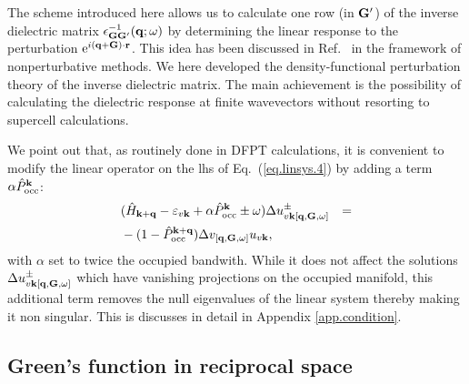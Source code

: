 \documentclass[twocolumn,prb,showpacs,superscriptaddress]{revtex4}
\def\w{\omega}
\def\H{\hat{H}}
\def\P{\hat{P}_{\rm occ}}
\def\E{\varepsilon}
\def\q{{\bf q}}
\def\k{{\bf k}}
\def\G{{\bf G}}
\def\Gp{{\bf G^\prime}}
\def\r{{\bf r}}
\begin{document}
The scheme introduced here allows us to calculate one row (in $\Gp$) of the inverse dielectric
matrix $\epsilon^{-1}_{\G\Gp}(\q;\w)$ by determining the linear response to the
perturbation ${\rm e}^{i(\q+\G)\cdot\r}$. This idea has been discussed in Ref.\ 
in the framework of nonperturbative methods. We here developed the density-functional
perturbation theory of the inverse dielectric matrix. The main achievement is the
possibility of calculating the dielectric response at finite wavevectors without
resorting to supercell calculations.


  

We point out that, as routinely done in DFPT calculations, 
it is convenient to modify the linear operator on the lhs of Eq.\ (\ref{eq.linsys.4}) by adding
a term $\alpha \P^\k$:
 \begin{eqnarray} \label{eq.linsys.5}
&  (\H_{\k+\q}-\E_{v\k}+\alpha\P^\k \pm\w) \Delta u^\pm_{v\k[\q,\G,\w]}  & = \nonumber \\
&   -(1-\P^{\k+\q}) \Delta v_{[\q,\G,\w]} u_{v\k}, & 
  \end{eqnarray}
with $\alpha$ set to twice the occupied bandwith.
While it does not affect the solutions $\Delta u^\pm_{v\k[\q,\G,\w]}$ which have
vanishing projections on the occupied manifold, this additional term removes
the null eigenvalues of the linear system thereby making it non singular.
This is discusses in detail in Appendix \ref{app.condition}.

\subsection{Green's function in reciprocal space}\label{sec.green.g}
\end{document}
